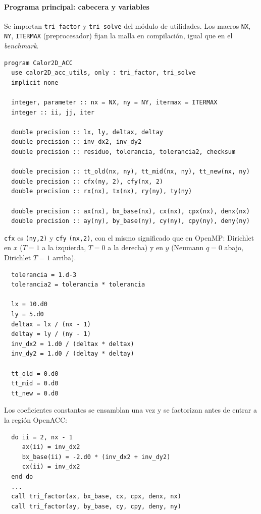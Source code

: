 \documentclass[11pt,a4paper]{article}
\begin{document}
\paragraph{Programa principal: cabecera y variables}

\medskip

Se importan \texttt{tri\_factor} y \texttt{tri\_solve} del m\'odulo de
utilidades. Los macros \texttt{NX}, \texttt{NY}, \texttt{ITERMAX} (preprocesador)
fijan la malla en compilaci\'on, igual que en el \emph{benchmark}.

\begin{verbatim}
program Calor2D_ACC
  use calor2D_acc_utils, only : tri_factor, tri_solve
  implicit none

  integer, parameter :: nx = NX, ny = NY, itermax = ITERMAX
  integer :: ii, jj, iter

  double precision :: lx, ly, deltax, deltay
  double precision :: inv_dx2, inv_dy2
  double precision :: residuo, tolerancia, tolerancia2, checksum

  double precision :: tt_old(nx, ny), tt_mid(nx, ny), tt_new(nx, ny)
  double precision :: cfx(ny, 2), cfy(nx, 2)
  double precision :: rx(nx), tx(nx), ry(ny), ty(ny)

  double precision :: ax(nx), bx_base(nx), cx(nx), cpx(nx), denx(nx)
  double precision :: ay(ny), by_base(ny), cy(ny), cpy(ny), deny(ny)
\end{verbatim}

\texttt{cfx} es \texttt{(ny,2)} y \texttt{cfy} \texttt{(nx,2)}, con el mismo
significado que en OpenMP: Dirichlet en $x$ ($T=1$ a la izquierda, $T=0$ a la
derecha) y en $y$ (Neumann $q=0$ abajo, Dirichlet $T=1$ arriba).

\begin{verbatim}
  tolerancia = 1.d-3
  tolerancia2 = tolerancia * tolerancia

  lx = 10.d0
  ly = 5.d0
  deltax = lx / (nx - 1)
  deltay = ly / (ny - 1)
  inv_dx2 = 1.d0 / (deltax * deltax)
  inv_dy2 = 1.d0 / (deltay * deltay)

  tt_old = 0.d0
  tt_mid = 0.d0
  tt_new = 0.d0
\end{verbatim}

Los coeficientes constantes se ensamblan una vez y se factorizan antes de entrar
a la regi\'on OpenACC:

\begin{verbatim}
  do ii = 2, nx - 1
     ax(ii) = inv_dx2
     bx_base(ii) = -2.d0 * (inv_dx2 + inv_dy2)
     cx(ii) = inv_dx2
  end do
  ...
  call tri_factor(ax, bx_base, cx, cpx, denx, nx)
  call tri_factor(ay, by_base, cy, cpy, deny, ny)
\end{verbatim}
\end{document}
